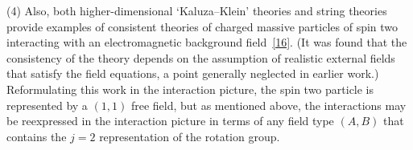 (4) Also, both higher-dimensional `Kaluza--Klein' theories and string theories
provide examples of consistent theories of charged massive particles of spin
two interacting with an electromagnetic background field~\hyperref[ref:5.16]{[16]}. (It was found
that the consistency of the theory depends on the assumption of realistic
external fields that satisfy the field equations, a point generally neglected
in earlier work.) Reformulating this work in the interaction picture, the spin
two particle is represented by a $(1,1)$ free field, but as mentioned above,
the interactions may be reexpressed in the interaction picture in terms of any
field type $(A,B)$ that contains the $j=2$ representation of the rotation
group.
